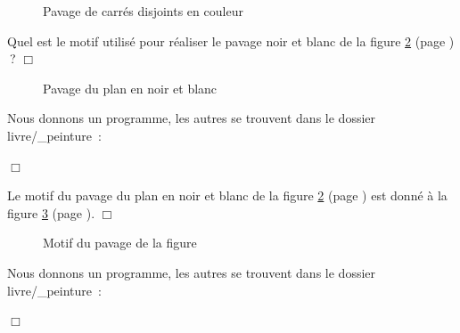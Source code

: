 \begin{figure}[htbp]
\vspace*{\textwidth}%
\vspace*{25mm}%
%
\vspace*{-\textwidth}%
\vspace*{-25mm}%
\caption{Pavage de carrés disjoints en couleur}\label{fig:pdcc}
\end{figure}
\begin{exercice}{Quel est le motif utilisé pour réaliser le pavage noir et blanc de la figure \ref{fig:pavhexond}
(page \pageref{fig:pavhexond})$\:$?
\noindent $\Box$}\end{exercice}
\begin{figure}[htbp]
 \caption{Pavage du plan en noir et blanc}\label{fig:pavhexond}
\end{figure}
\begin{corrige}{
Nous donnons un programme, les autres se trouvent dans le dossier {\idt livre/\_peinture}~:

\noindent $\Box$}\end{corrige}
\begin{corrige}{
Le motif du pavage du plan en noir et blanc de la figure \ref{fig:pavhexond}
(page \pageref{fig:pavhexond}) est donné à la figure \ref{fig:motpavhexond}
(page \pageref{fig:motpavhexond}).
\noindent $\Box$}\end{corrige}
\begin{figure}[htbp]
 \caption{Motif du pavage de la figure \protect{\ref{fig:pavhexond}}}\label{fig:motpavhexond}
\end{figure}
\begin{corrige}{
Nous donnons un programme, les autres se trouvent dans le dossier {\idt livre/\_peinture}~:
\label{prog:BalleEnCouleur}

\noindent $\Box$}\end{corrige}

\vfill

